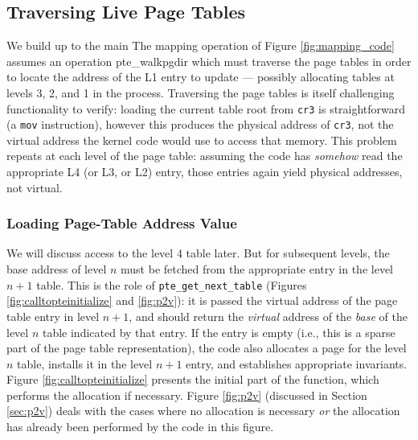 \subsection{Traversing Live Page Tables}
\label{sec:traversing}
We build up to the main 
The mapping operation of Figure \ref{fig:mapping_code} assumes an operation \textsf{pte\_walkpgdir} which must traverse the page tables
in order to locate the address of the L1 entry to update --- possibly allocating tables at levels 3, 2, and 1 in the process.
Traversing the page tables is itself challenging functionality to verify: loading the current table root from \lstinline|cr3| is straightforward
(a \lstinline|mov| instruction), however this produces the physical address of \lstinline|cr3|, not the virtual address the kernel code would use to access that memory.
This problem repeats at each level of the page table: assuming the code has \emph{somehow} read the appropriate L4 (or L3, or L2) entry, those entries again
yield physical addresses, not virtual.

\subsubsection{Loading Page-Table Address Value}
We will discuss access to the level 4 table later. But for subsequent levels, the base address of level $n$ must be
fetched from the appropriate entry in the level $n+1$ table.
This is the role of \lstinline|pte_get_next_table| (Figures \ref{fig:calltopteinitialize} and \ref{fig:p2v}):
it is passed the virtual address of the page table entry in level $n+1$, and should return the \emph{virtual} 
address of the \emph{base} of the level $n$ table
indicated by that entry.
If the entry is empty (i.e., this is a sparse part of the page table representation),
the code also allocates a page for the level $n$ table, installs it in the level $n+1$ entry, and establishes appropriate invariants.
Figure \ref{fig:calltopteinitialize} presents the initial part of the function, which performs the allocation if necessary.
Figure \ref{fig:p2v} (discussed in Section \ref{sec:p2v}) deals with the cases where no allocation is necessary \emph{or} the allocation has already
been performed by the code in this figure.

